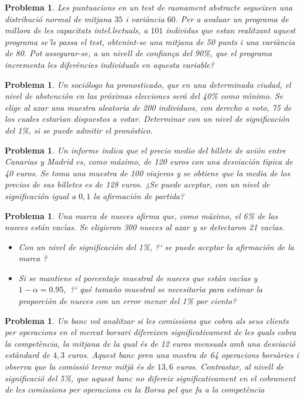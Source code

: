 \documentclass[11pt]{article}
\newcounter{prbcont}
\newtheorem{problema}[prbcont]{Problema}
\begin{document}
\begin{problema}
Les puntuacions en un test de raonament abstracte segueixen una distribuci\'o normal de mitjana $35$ i vari\`ancia $60.$ Per a avaluar un programa de millora de les capacitats intel.lectuals, a $101$ individus que estan realitzant aquest programa se'ls passa el test, obtenint-se una mitjana de 50 punts i una vari\`ancia de 80. Pot assegurar-se, a un nivell de confian\c{c}a del 90\%, que el programa incrementa les difer\`encies individuals en aquesta variable? 
\end{problema}


\begin{problema}
Un soci\'ologo ha pronosticado, que en una determinada ciudad, el nivel de abstenci\'on en las pr\'oximas elecciones ser\'a del 40\% como m\'{\i}nimo. Se elige al azar una muestra aleatoria de 200 individuos, con derecho a voto, 75 de los cuales estar\'{\i}an dispuestos a votar. Determinar con un nivel de significaci\'on del 1\%, si se puede admitir el pron\'ostico.
\end{problema}

\begin{problema}
Un informe indica que el precio medio del billete de avi\'on entre Canarias y Madrid es, como m\'aximo, de 120 euros con una desviaci\'on t\'{\i}pica de 40 euros. Se toma una muestra de 100 viajeros y se obtiene que la media de los precios de sus billetes es de 128 euros. ¿Se puede aceptar, con un nivel de significaci\'on igual a $0,1$ la afirmaci\'on de partida?
\end{problema}

\begin{problema}
Una marca de nueces afirma que, como m\'aximo, el 6\% de las nueces est\'an vac\'{\i}as. Se eligieron 300 nueces al azar y se detectaron 21 vac\'{\i}as.
\begin{itemize}
\item [(a)] Con un nivel de significaci\'on del 1\%, ?` se puede aceptar la afirmaci\'on de la marca ?
\item [(b)] Si se mantiene el porcentaje muestral de nueces que est\'an vac\'{\i}as y $1-\alpha = 0.95,$ ?` qu\'e tama\~no muestral se necesitar\'{\i}a para estimar la proporci\'on de nueces con un error menor del 1\% por ciento?
\end{itemize}
\end{problema}

\begin{problema}
Un banc vol analitzar si les comissions que cobra als seus clients per operacions en el mercat borsari difereixen significativament de les quals cobra la compet\`encia, la mitjana de la qual \'es de 12 euros mensuals amb una desviaci\'o est\`andard de $4,3$ euros. Aquest banc pren una mostra de 64 operacions bors\`aries i observa que la comissi\'o terme mitj\`a \'es de $13,6$ euros. Contrastar, al nivell de significaci\'o del 5\%, que aquest banc no difereix significativament en el cobrament de les comissions per operacions en la Borsa pel que fa a la compet\`encia 
\end{problema}
\end{document}
